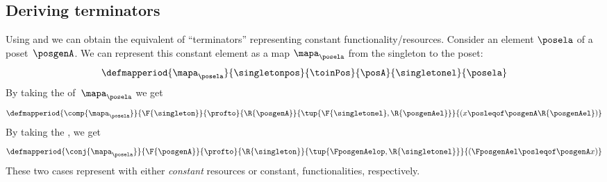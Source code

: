 \subsection{Deriving terminators}
Using  and  we can obtain the equivalent of ``terminators'' representing constant functionality/resources.
Consider an element $\posela$ of a poset~$\posgenA$.
We can represent this constant element as a map $\mapa_{\posela}$ from the singleton to the poset:
%
\begin{equation}
    \defmapperiod{
        \mapa_{\posela}
    }{
        \singletonpos
    }{
        \toinPos
    }{
        \posA
    }{
        \singletonel
    }{
        \posela
    }
\end{equation}
%
By taking the  of~$\mapa_{\posela}$ we get
%
\begin{equation}
    \defmapperiod{
        \comp{\mapa_{\posela}}
    }{
        \F{\singleton}
    }{
        \profto
    }{
        \R{\posgenA}
    }{
        \tup{\F{\singletonel},\R{\posgenAel}}
    }{
        ( x \posleqof\posgenA \R{\posgenAel})
    }
\end{equation}
By taking the , we get
\begin{equation}
    \defmapperiod{
        \conj{\mapa_{\posela}}
    }{
        \F{\posgenA}
    }{
        \profto
    }{
        \R{\singleton}
    }{
        \tup{\FposgenAelop,\R{\singletonel}}
    }{
        (\FposgenAel\posleqof\posgenA x)
    }
\end{equation}
These two cases represent  with either \emph{constant} resources or constant, functionalities, respectively.
